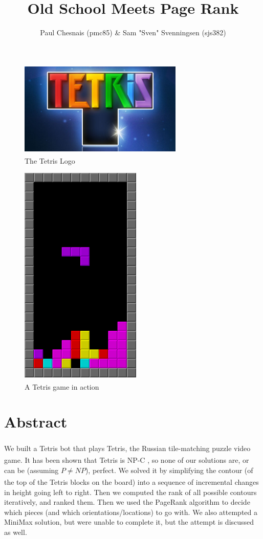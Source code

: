\documentclass{article}
\title{Old School \tetris{} Meets Page Rank}
\author{Paul Chesnais (pmc85) \& Sam "Sven" Svenningsen (sjs382)}
\date{}
\def\tetris{Tetris\textsuperscript{\textregistered}}
\begin{document}
\maketitle
\thispagestyle{empty}
\begin{figure}[H]
  \centering
  \includegraphics[height=125pt]{tetris}
  \caption{The \tetris{} Logo}
  \label{fig:the_tetris}
\end{figure}
\begin{figure}[H]
  \centering
  \includegraphics[height=300pt]{tetris_screen}
  \caption{A \tetris{} game in action}
  \label{fig:the_tetris_board}
\end{figure}
\newpage
\section{Abstract}
\label{sec:abstract}

\par We built a \tetris{} bot that plays \tetris{}, the Russian tile-matching puzzle video game. It has been shown that \tetris{} is NP-C \cite{tetrishard}, so none of our solutions are, or can be (assuming $P \neq NP$), perfect.  We solved it by simplifying the contour (of the top of the \tetris{} blocks on the board) into a sequence of incremental changes in height going left to right. Then we computed the rank of all possible contours iteratively, and ranked them. Then we used the PageRank algorithm to decide which pieces (and which orientations/locations) to go with. We also attempted a MiniMax solution, but were unable to complete it, but the attempt is discussed as well.
\end{document}

